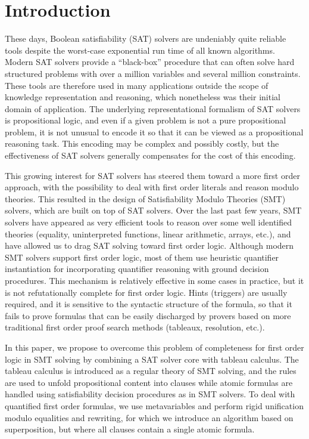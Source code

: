 
\section{Introduction}

These days, Boolean satisfiability (SAT) solvers are undeniably quite reliable
tools despite the worst-case exponential run time of all known
algorithms. Modern SAT solvers provide a ``black-box'' procedure that can often
solve hard structured problems with over a million variables and several million
constraints. These tools are therefore used in many applications outside the
scope of knowledge representation and reasoning, which nonetheless was their
initial domain of application. The underlying representational formalism of SAT
solvers is propositional logic, and even if a given problem is not a pure
propositional problem, it is not unusual to encode it so that it can be viewed
as a propositional reasoning task. This encoding may be complex and possibly
costly, but the effectiveness of SAT solvers generally compensates for the cost
of this encoding.

This growing interest for SAT solvers has steered them toward a more first order
approach, with the possibility to deal with first order literals and reason
modulo theories. This resulted in the design of Satisfiability Modulo Theories
(SMT) solvers, which are built on top of SAT solvers. Over the last past few
years, SMT solvers have appeared as very efficient tools to reason over some
well identified theories (equality, uninterpreted functions, linear arithmetic,
arrays, etc.), and have allowed us to drag SAT solving toward first order logic.
Although modern SMT solvers support first order logic, most of them use
heuristic quantifier instantiation for incorporating quantifier reasoning with
ground decision procedures. This mechanism is relatively effective in some cases
in practice, but it is not refutationally complete for first order logic. Hints
(triggers) are usually required, and it is sensitive to the syntactic structure
of the formula, so that it fails to prove formulas that can be easily discharged
by provers based on more traditional first order proof search methods (tableaux,
resolution, etc.).

In this paper, we propose to overcome this problem of completeness for first
order logic in SMT solving by combining a SAT solver core with tableau
calculus. The tableau calculus is introduced as a regular theory of SMT solving,
and the rules are used to unfold propositional content into clauses while atomic
formulas are handled using satisfiability decision procedures as in
SMT solvers. To deal with quantified first order formulas, we use
metavariables and perform rigid unification modulo equalities and rewriting, for
which we introduce an algorithm based on superposition, but where all clauses
contain a single atomic formula.

